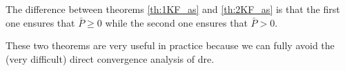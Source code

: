 \begin{obs}
    The difference between theorems \ref{th:1KF_as} and \ref{th:2KF_as} is that the first one ensures that $\bar{P} \ge 0$ while the second one ensures that $\bar{P} > 0$. 
\end{obs}

These two theorems are very useful in practice because we can fully avoid the (very difficult) direct convergence analysis of \gls{dre}.


